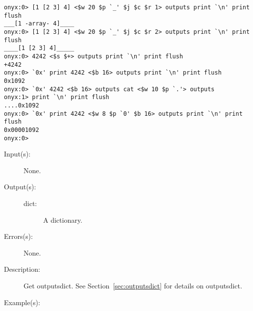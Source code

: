 \begin{description}
\begin{description}
\begin{verbatim}
onyx:0> [1 [2 3] 4] <$w 20 $p `_' $j $c $r 1> outputs print `\n' print flush
___[1 -array- 4]____
onyx:0> [1 [2 3] 4] <$w 20 $p `_' $j $c $r 2> outputs print `\n' print flush
____[1 [2 3] 4]_____
onyx:0> 4242 <$s $+> outputs print `\n' print flush
+4242
onyx:0> `0x' print 4242 <$b 16> outputs print `\n' print flush
0x1092
onyx:0> `0x' 4242 <$b 16> outputs cat <$w 10 $p `.'> outputs 
onyx:1> print `\n' print flush
....0x1092
onyx:0> `0x' print 4242 <$w 8 $p `0' $b 16> outputs print `\n' print flush
0x00001092
onyx:0>
		\end{verbatim}
	\end{description}
\label{systemdict:outputsdict}
\item[{\onyxop{--}{outputsdict}{dict}}: ]
	\begin{description}\item[]
	\item[Input(s): ] None.
	\item[Output(s): ]
		\begin{description}\item[]
		\item[dict: ]
			A dictionary.
		\end{description}
	\item[Errors(s): ] None.
	\item[Description: ]
		Get outputsdict.  See Section~\ref{sec:outputsdict} for details
		on outputsdict.
	\item[Example(s): ]\begin{verbatim}


\end{verbatim}
\end{description}
\end{description}
